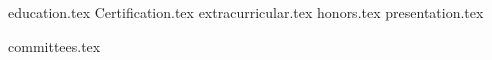 \documentclass[11pt, a4paper]{awesome-cv}
\newcommand*{\sectiondir}{resume/}
\begin{document}
\makecvheader

{education.tex}
{Certification.tex}
{extracurricular.tex}
{honors.tex}
{presentation.tex}



{committees.tex}
\end{document}
